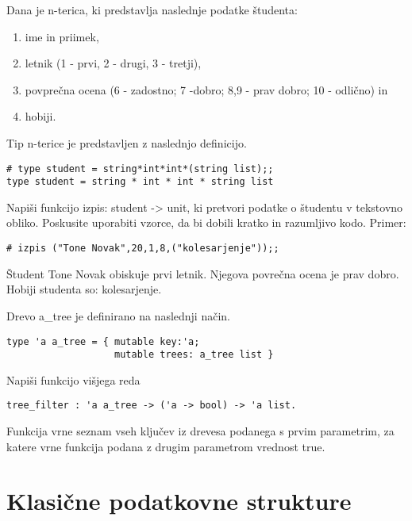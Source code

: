 \begin{ex}
Dana je n-terica, ki predstavlja naslednje podatke \v studenta:
\begin{enumerate}
\item ime in priimek,
\item letnik (1 - prvi, 2 - drugi, 3 - tretji),
\item povpre\v cna ocena (6 - zadostno; 7 -dobro; 8,9 - prav dobro; 10 - odli\v cno) in
\item hobiji.
\end{enumerate}

Tip n-terice je predstavljen z naslednjo definicijo.
\begin{lstlisting}
# type student = string*int*int*(string list);;
type student = string * int * int * string list
\end{lstlisting}

Napi\v si funkcijo izpis: student -> unit, ki pretvori podatke o \v studentu v tekstovno obliko. Poskusite uporabiti vzorce, da bi dobili kratko in razumljivo kodo.
Primer: 
\begin{lstlisting}
# izpis ("Tone Novak",20,1,8,("kolesarjenje"));; 
\end{lstlisting}
\v Student Tone Novak obiskuje prvi letnik. Njegova povre\v cna ocena je prav dobro. Hobiji studenta so: kolesarjenje.
\end{ex}




\begin{ex}
Drevo a\_tree je definirano na naslednji na\v cin.
\begin{lstlisting}
type 'a a_tree = { mutable key:'a; 
                   mutable trees: a_tree list }
\end{lstlisting}

Napi\v si funkcijo vi\v sjega reda
\begin{lstlisting}
tree_filter : 'a a_tree -> ('a -> bool) -> 'a list.
\end{lstlisting}
Funkcija vrne seznam vseh klju\v cev iz drevesa podanega s prvim parametrim, za katere vrne funkcija podana z drugim parametrom vrednost true.
\end{ex} 






\section{Klasi\v cne podatkovne strukture}





